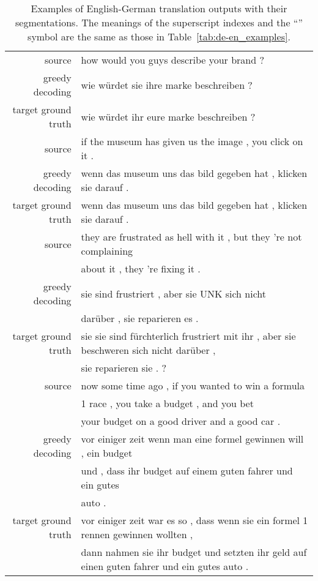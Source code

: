 \documentclass{article}
\begin{document}
{\begin{table*}[h!] 

	\begin{small}
		{
			\begin{center}
				\begin{tabular}{rl}
					\hline
source &  how would you guys describe your brand ?
					\\
					greedy decoding& wie  w\"urdet  sie  ihre marke  beschreiben ? \\
					target ground truth & wie w\"urdet ihr eure marke beschreiben ?				
					\\			
\hline
					source &  if the museum has given us the image , you click on it .\\
					greedy decoding&  wenn  das museum  uns  das bild  gegeben hat , klicken sie  darauf  . \\
					target ground truth & wenn das museum uns das bild gegeben hat , klicken sie darauf .
					\\			
					\hline
source &  they are frustrated as hell with it , but they 're  not complaining\\& about it , they 're fixing it .
					\\
					greedy decoding&  sie sind  frustriert  ,  aber  sie UNK sich  nicht  \\& dar\"uber  ,   sie reparieren  es  .   \\
					target ground truth & sie sie sind f\"urchterlich frustriert mit ihr , aber sie beschweren sich nicht dar\"uber ,\\& sie reparieren sie . ?\\			
					\hline			
source & now some time ago , if you wanted to win a formula  \\ & 1 race , you  take a budget  ,  and you  bet \\ &your budget on a good driver and a good car .					
					\\
					greedy decoding&   vor einiger zeit   wenn   man   eine formel   gewinnen will ,   ein budget  \\ & und   , dass  ihr budget  auf einem guten  fahrer    und  ein gutes  \\& auto  .\\
					target ground truth & vor einiger zeit war es so , dass wenn sie ein formel 1 rennen gewinnen wollten , \\& dann nahmen sie ihr budget und setzten ihr geld auf einen guten fahrer und ein gutes auto . 					
					\\			
					\hline
				\end{tabular}
			\end{center}
		}
	\end{small}
  \caption{\small{Examples of English-German translation outputs with their
  segmentations.  The meanings of the superscript indexes and the ``''
  symbol are the same as those in Table~\ref{tab:de-en_examples}.}}
  \label{tab:en-de_examples}
\end{table*}

}
\end{document}
